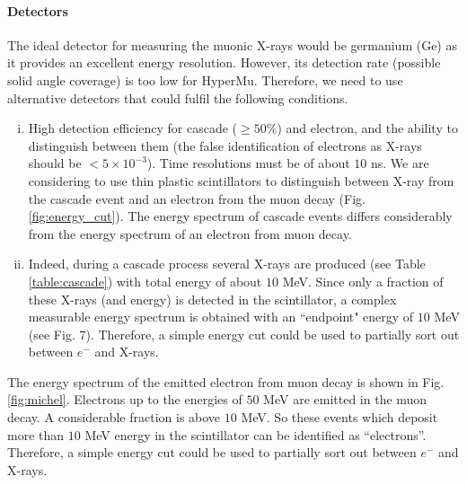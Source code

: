\documentclass[12pt]{article}
\begin{document}
\paragraph{Detectors}
The ideal detector for measuring the muonic X-rays would be germanium (Ge) as it provides an excellent energy resolution. However, its detection rate (possible solid angle coverage) is too low for HyperMu. Therefore, we need to use alternative detectors that could fulfil the following conditions.
\begin{enumerate}[i.]
\item
High detection efficiency for cascade ($\geq 50\%$) and electron, and the ability to distinguish between them (the false identification of electrons as X-rays should be $< 5 \times 10^{-3}$). Time resolutions must be of about $10$ ns. We are considering to use thin plastic scintillators to distinguish between X-ray from the cascade event and an electron from the muon decay (Fig. \ref{fig:energy_cut}). The energy spectrum of cascade events differs considerably from the energy spectrum of an electron from muon decay. 
\item
Indeed, during a cascade process several X-rays are produced (see Table \ref{table:cascade}) with total energy of about $10$ MeV. Since only a fraction of these X-rays (and energy) is detected in the scintillator, a complex measurable energy spectrum is obtained with an ``endpoint" energy of $10$ MeV (see Fig. 7). Therefore, a simple energy cut could be used to partially sort out between $e^-$ and X-rays. 
\end{enumerate}
The energy spectrum of the emitted electron from muon decay is shown in Fig. \ref{fig:michel}. Electrons up to the energies of $50$ MeV are emitted in the muon decay. A considerable fraction is above $10$ MeV. So these events which deposit more than $10$ MeV energy in the scintillator can be identified as ``electrons''. Therefore, a simple energy cut could be used to partially sort out between $e^-$ and X-rays.
\end{document}
